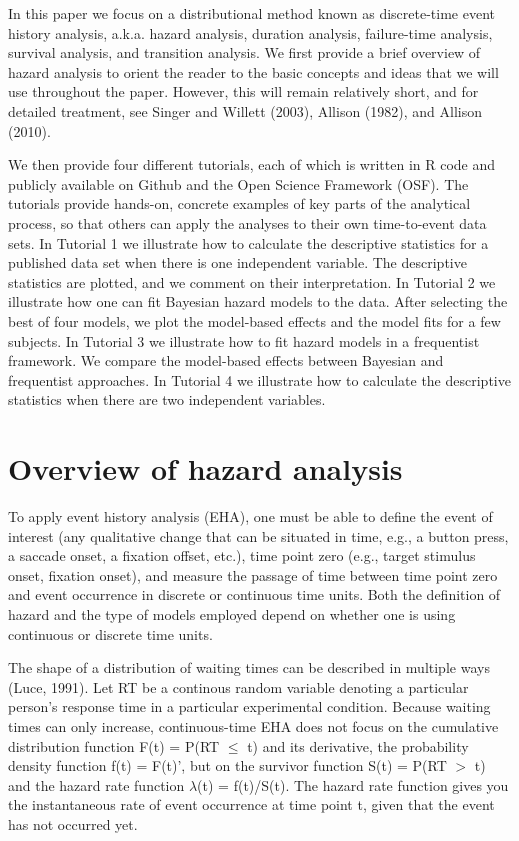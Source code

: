 \documentclass[
  man,floatsintext]{apa6}
\begin{document}
In this paper we focus on a distributional method known as discrete-time event history analysis, a.k.a. hazard analysis, duration analysis, failure-time analysis, survival analysis, and transition analysis.
We first provide a brief overview of hazard analysis to orient the reader to the basic concepts and ideas that we will use throughout the paper. However, this will remain relatively short, and for detailed treatment, see Singer and Willett (2003), Allison (1982), and Allison (2010).

We then provide four different tutorials, each of which is written in R code and publicly available on Github and the Open Science Framework (OSF). The tutorials provide hands-on, concrete examples of key parts of the analytical process, so that others can apply the analyses to their own time-to-event data sets. In Tutorial 1 we illustrate how to calculate the descriptive statistics for a published data set when there is one independent variable. The descriptive statistics are plotted, and we comment on their interpretation. In Tutorial 2 we illustrate how one can fit Bayesian hazard models to the data. After selecting the best of four models, we plot the model-based effects and the model fits for a few subjects. In Tutorial 3 we illustrate how to fit hazard models in a frequentist framework. We compare the model-based effects between Bayesian and frequentist approaches. In Tutorial 4 we illustrate how to calculate the descriptive statistics when there are two independent variables.

\section{Overview of hazard analysis}\label{overview-of-hazard-analysis}

To apply event history analysis (EHA), one must be able to define the event of interest (any qualitative change that can be situated in time, e.g., a button press, a saccade onset, a fixation offset, etc.), time point zero (e.g., target stimulus onset, fixation onset), and measure the passage of time between time point zero and event occurrence in discrete or continuous time units. Both the definition of hazard and the type of models employed depend on whether one is using continuous or discrete time units.

The shape of a distribution of waiting times can be described in multiple ways (Luce, 1991). Let RT be a continous random variable denoting a particular person's response time in a particular experimental condition. Because waiting times can only increase, continuous-time EHA does not focus on the cumulative distribution function F(t) = P(RT \(\leq\) t) and its derivative, the probability density function f(t) = F(t)', but on the survivor function S(t) = P(RT \(>\) t) and the hazard rate function \(\lambda\)(t) = f(t)/S(t). The hazard rate function gives you the instantaneous rate of event occurrence at time point t, given that the event has not occurred yet.
\end{document}

